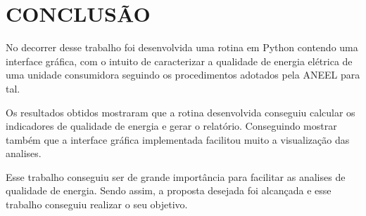 \chapter{CONCLUSÃO}

No decorrer desse trabalho foi desenvolvida uma rotina em Python contendo uma interface gráfica, com o intuito de caracterizar a qualidade de energia elétrica de uma unidade consumidora seguindo os procedimentos adotados pela ANEEL para tal.

Os resultados obtidos mostraram que a rotina desenvolvida conseguiu calcular os indicadores de qualidade de energia e gerar o relatório. Conseguindo mostrar também que a interface gráfica implementada facilitou muito a visualização das analises.

Esse trabalho conseguiu ser de grande importância para facilitar as analises de qualidade de energia. Sendo assim, a proposta desejada foi alcançada e esse trabalho conseguiu realizar o seu objetivo.